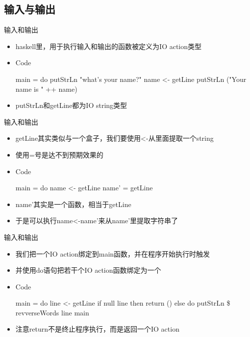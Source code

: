 \documentclass[xcolor=dvipsnames, 11pt]{beamer}
\newenvironment{code}{\begin{block}{Code}\begin{semiverbatim} \begin{footnotesize}}{\end{footnotesize}\end{semiverbatim}\end{block}}
\newenvironment{iit}{\begin{itemize}\setlength{\itemsep}{0.2cm}}{\end{itemize}}
\begin{document}
\subsection{输入与输出}
\begin{frame}[fragile]{输入和输出}
\begin{iit}
\item<2->haskell里，用于执行输入和输出的函数被定义为IO action类型
\item<3->[]\begin{code}
main = do 
    putStrLn "what's your name?" 
    name <- getLine 
    putStrLn ("Your name is " ++ name)
\end{code}
\item<4->putStrLn和getLine都为IO string类型
\end{iit}
\end{frame}

\begin{frame}[fragile]{输入和输出}
\begin{iit}
\item<2->getLine其实类似与一个盒子，我们要使用<-从里面提取一个string
\item<3->使用=号是达不到预期效果的
\item<4->[]\begin{code}
main = do 
    name <- getLine
    name' = getLine
\end{code}
\item<5->name'其实是一个函数，相当于getLine
\item<6->于是可以执行name<-name'来从name'里提取字符串了
\end{iit}
\end{frame}

\begin{frame}[fragile]{输入和输出}
\begin{iit}
\item<2->我们把一个IO action绑定到main函数，并在程序开始执行时触发
\item<3->并使用do语句把若干个IO action函数绑定为一个
\item<4->[]\begin{code}
main = do 
    line <- getLine 
    if null line 
        then return () 
        else do 
            putStrLn \$ revverseWords line 
            main 
\end{code}
\item<5->注意return不是终止程序执行，而是返回一个IO action
\end{iit}
\end{frame}
\end{document}
